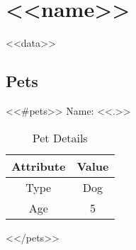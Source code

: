 \section{ <<name>> }
<<data>>
\subsection{Pets}
<<#pets>>
Name: <<.>>
\begin{table}[h!]
\centering
\begin{tabular}{|c|c|}
Attribute & Value \\ \hline
Type      & Dog   \\ 
Age       & 5     \\
\end{tabular}
\caption{Pet Details}
\end{table}
<</pets>>
